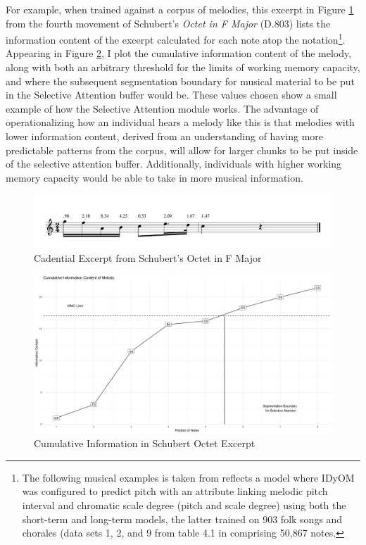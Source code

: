 \documentclass[12pt,]{book}
\let\rmarkdownfootnote\footnote%
\def\footnote{\protect\rmarkdownfootnote}
\begin{document}
For example, when trained against a corpus of melodies, this excerpt in Figure \ref{fig:schubertF} from the fourth movement of Schubert's \emph{Octet in F Major} (D.803) lists the information content of the excerpt calculated for each note atop the notation\footnote{The following musical examples is taken from \citet{pearceStatisticalLearningProbabilistic2018a} reflects a model where IDyOM was configured to predict pitch with an attribute linking melodic pitch interval and chromatic scale degree (pitch and scale degree) using both the short-term and long-term models, the latter trained on 903 folk songs and chorales (data sets 1, 2, and 9 from table 4.1 in \citep{schaffrathEssenFolkSong1995} comprising 50,867 notes.}.
Appearing in Figure \ref{fig:cumSchubert}, I plot the cumulative information content of the melody, along with both an arbitrary threshold for the limits of working memory capacity, and where the subsequent segmentation boundary for musical material to be put in the Selective Attention buffer would be.
These values chosen show a small example of how the Selective Attention module works.
The advantage of operationalizing how an individual hears a melody like this is that melodies with lower information content, derived from an understanding of having more predictable patterns from the corpus, will allow for larger chunks to be put inside of the selective attention buffer.
Additionally, individuals with higher working memory capacity would be able to take in more musical information.

\begin{figure}

{\centering \includegraphics[width=1\linewidth]{img/SchubertF} 

}

\caption{Cadential Excerpt from Schubert's Octet in F Major}\label{fig:schubertF}
\end{figure}

\begin{figure}

{\centering \includegraphics[width=1\linewidth]{img/SchubertPlotNew} 

}

\caption{Cumulative Information in Schubert Octet Excerpt}\label{fig:cumSchubert}
\end{figure}
\end{document}
